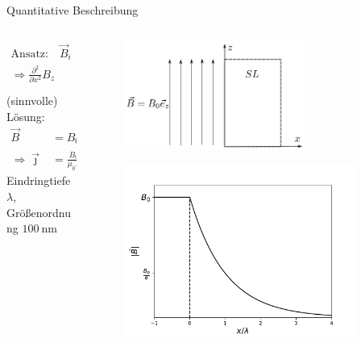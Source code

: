 \begin{frame}{Quantitative Beschreibung}

\begin{columns}
\begin{column}{0.49\textwidth}
\begin{align*}
    \text{Ansatz:} \quad \vec{B}_i &= (0, 0, B_z(x))^T \\
  \Rightarrow \frac{\partial ^2}{\partial x^2}B_z &= \frac{1}{\lambda ^2}B_z, \quad \lambda = \sqrt{\frac{m}{\mu_0 n q^2}}
\end{align*}
(sinnvolle) Lösung:
\begin{align*}
   \vec{B} &= B_0 \exp\left[-\frac{x}{\lambda}\right]\vec{e}_z \\
   \Rightarrow \vec{\jmath} &= \frac{B_0}{\mu_0 \lambda}\exp \left[-\frac{x}{\lambda} \right] \vec{e}_y
\end{align*}
Eindringtiefe $\lambda$, Größenordnung $\SI{100}{\nano\meter}$
\end{column}
\begin{column}{0.49\textwidth}
  \begin{figure}
    \centering
    \includegraphics[width = 0.7\textwidth]{bilder/supra_3.pdf}
    \label{fig: londongleichungen}
  \end{figure}
  \pause
  \begin{figure}
    \centering
    \includegraphics[width = 0.9\textwidth]{bilder/plot_london.pdf}
    \label{fig: plot_londongleichungen}
  \end{figure}
\end{column}
\end{columns}

\end{frame}


